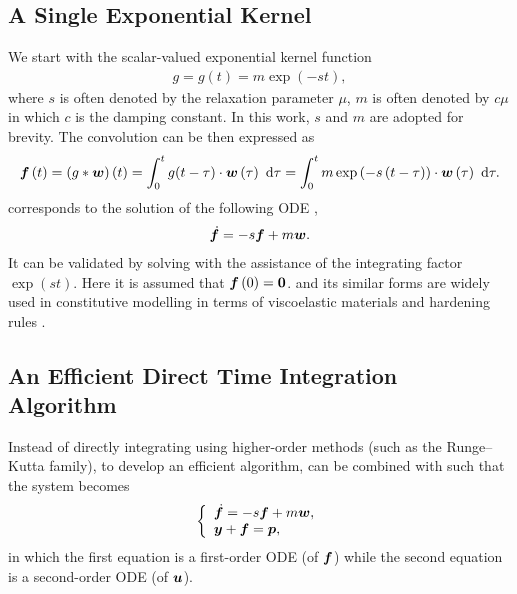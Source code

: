 \subsection{A Single Exponential Kernel}
We start with the scalar-valued exponential kernel function
\begin{gather}
g=g\left(t\right)=m\exp\left(-st\right),
\end{gather}
where $s$ is often denoted by the relaxation parameter $\mu$, $m$ is often denoted by $c\mu$ in which $c$ is the damping constant. In this work, $s$ and $m$ are adopted for brevity.
The convolution can be then expressed as
\begin{gather}\label{eq:single_conv}
\bm{f}\left(t\right)=\left(g*\bm{w}\right)\left(t\right)=\int_0^tg(t-\tau)\cdot\bm{w}\left(\tau\right)~\mathrm{d}\tau=\int_0^tm\exp\left(-s\left(t-\tau\right)\right)\cdot\bm{w}\left(\tau\right)~\mathrm{d}\tau.
\end{gather}
 corresponds to the solution of the following ODE \citep[see, e.g.,][\S~80]{Zwillinger2021},
\begin{gather}\label{eq:single_conv_ode}
\dot{\bm{f}}=-s\bm{f}+m\bm{w}.
\end{gather}
It can be validated by solving  with the assistance of the integrating factor $\exp\left(st\right)$. Here it is assumed that $\bm{f}\left(0\right)=\bm{0}$.  and its similar forms are widely used in constitutive modelling in terms of viscoelastic materials \citep[e.g.,][]{Muravyov1998} and hardening rules \citep[e.g.,][]{Chaboche1989}.
\subsection{An Efficient Direct Time Integration Algorithm}
Instead of directly integrating  using higher-order methods (such as the Runge--Kutta family), to develop an efficient algorithm,  can be combined with  such that the system becomes
\begin{gather}\label{eq:eqv_sys}
\left\{
\begin{array}{l}
\dot{\bm{f}}=-s\bm{f}+m\bm{w},\\
\bm{y}+\bm{f}=\bm{p},
\end{array}\right.
\end{gather}
in which the first equation is a first-order ODE (of $\bm{f}$) while the second equation is a second-order ODE (of $\bm{u}$).

